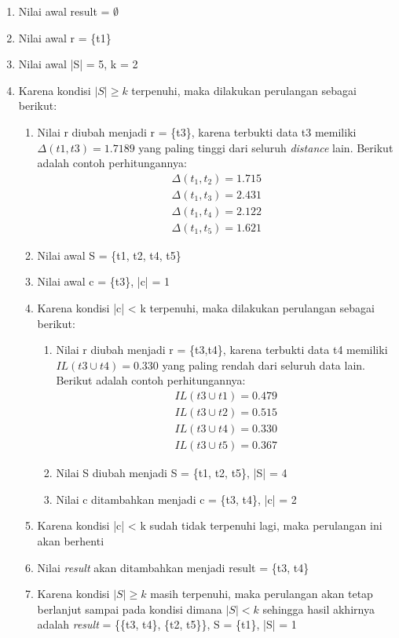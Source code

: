 \begin{enumerate}
\item Nilai awal result = $\emptyset$
\item Nilai awal r = \{t1\}
\item Nilai awal |S| = 5, k = 2
\item Karena kondisi $|S| \geq k$ terpenuhi, maka dilakukan perulangan sebagai berikut:
\begin{enumerate}
\item Nilai r diubah menjadi r = \{t3\}, karena terbukti data t3 memiliki $\Delta(t1,t3)=1.7189$ yang paling tinggi dari seluruh \textit{distance} lain. Berikut adalah contoh perhitungannya:
\begin{align*}
\Delta (t_1,t_2) = 1.715\\
\Delta (t_1,t_3) = 2.431\\
\Delta (t_1,t_4) = 2.122\\
\Delta (t_1,t_5) = 1.621 
\end{align*}
\item Nilai awal S = \{t1, t2, t4, t5\}
\item Nilai awal c = \{t3\}, |c| = 1
\item Karena kondisi |c| < k terpenuhi, maka dilakukan perulangan sebagai berikut:

\begin{enumerate}
\item Nilai r diubah menjadi r = \{t3,t4\}, karena terbukti data t4 memiliki $IL(t3 \cup t4)=0.330$ yang paling rendah dari seluruh data lain. Berikut adalah contoh perhitungannya:
\begin{align*}
IL(t3 \cup t1) = 0.479 \\
IL(t3 \cup t2) = 0.515 \\
IL(t3 \cup t4) = 0.330 \\
IL(t3 \cup t5) = 0.367 
\end{align*}
\item Nilai S diubah menjadi S = \{t1, t2, t5\}, |S| = 4
\item Nilai c ditambahkan menjadi c = \{t3, t4\}, |c| = 2

\end{enumerate}
\item Karena kondisi |c| < k sudah tidak terpenuhi lagi, maka perulangan ini akan berhenti
\item Nilai \textit{result} akan ditambahkan menjadi result = \{t3, t4\}
\item Karena kondisi $|S| \geq k$ masih terpenuhi, maka perulangan akan tetap berlanjut sampai pada kondisi dimana $|S| < k$ sehingga hasil akhirnya adalah \textit{result} = \{\{t3, t4\}, \{t2, t5\}\}, S = \{t1\}, |S| = 1


\end{enumerate}
\end{enumerate}
